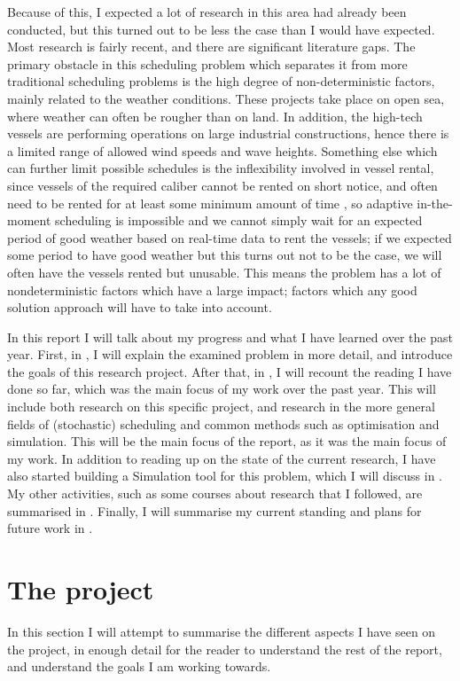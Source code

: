 \documentclass[a4paper,12pt]{article}
\begin{document}
Because of this, I expected a lot of research in this area had already been conducted, but this turned out to be less the case than I would have expected. Most research is fairly recent, and there are significant literature gaps. The primary obstacle in this scheduling problem which separates it from more traditional scheduling problems is the high degree of non-deterministic factors, mainly related to the weather conditions. These projects take place on open sea, where weather can often be rougher than on land. In addition, the high-tech vessels are performing operations on large industrial constructions, hence there is a limited range of allowed wind speeds and wave heights. Something else which can further limit possible schedules is the inflexibility involved in vessel rental, since vessels of the required caliber cannot be rented on short notice, and often need to be rented for at least some minimum amount of time \cite{kerkhove2017optimised}, so adaptive in-the-moment scheduling is impossible and we cannot simply wait for an expected period of good weather based on real-time data to rent the vessels; if we expected some period to have good weather but this turns out not to be the case, we will often have the vessels rented but unusable. This means the problem has a lot of nondeterministic factors which have a large impact; factors which any good solution approach will have to take into account. 

In this report I will talk about my progress and what I have learned over the past year. First, in , I will explain the examined problem in more detail, and introduce the goals of this research project. After that, in , I will recount the reading I have done so far, which was the main focus of my work over the past year. This will include both research on this specific project, and research in the more general fields of (stochastic) scheduling and common methods such as optimisation and simulation. This will be the main focus of the report, as it was the main focus of my work. In addition to reading up on the state of the current research, I have also started building a Simulation tool for this problem, which I will discuss in . My other activities, such as some courses about research that I followed, are summarised in . Finally, I will summarise my current standing and plans for future work in . 

\pagebreak

\section{The project} \label{s:project}
In this section I will attempt to summarise the different aspects I have seen on the project, in enough detail for the reader to understand the rest of the report, and understand the goals I am working towards.
\end{document}

